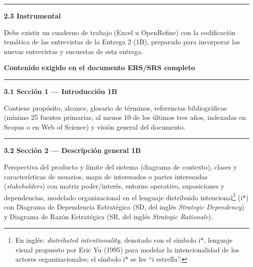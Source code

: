 \documentclass[11pt,a4paper]{article}
\newcounter{secc}
\newcommand{\secband}[1]{%
    \stepcounter{secc}\par\vspace{9pt}\noindent
    {\setlength{\fboxsep}{0pt}%
        \colorbox{uteqgold}{\parbox[c][20pt][c]{0.05\textwidth}{\centering\textbf{\color{white}\small \arabic{secc}}}}%
        \colorbox{uteqgreen}{\parbox[c][20pt][c]{0.95\textwidth}{\hspace{8pt}\textbf{\color{white}\small #1}}}%
    }\par\vspace{5pt}}
\newcommand{\submark}[1]{\par\vspace{4pt}\noindent
    {\color{uteqgreen}\rule[-1pt]{3.5pt}{12pt}}\hspace{6pt}\textbf{\color{uteqgreen}#1}\par\vspace{2pt}}
\newcommand{\bB}{{\setlength{\fboxsep}{1.5pt}\colorbox{uteqgold}{\scriptsize\bfseries\color{white}1B}}}
\begin{document}
\submark{2.3 Instrumental}
Debe existir un cuaderno de trabajo (Excel u OpenRefine) con la codificación temática de las entrevistas de la Entrega 2 (1B), preparado para incorporar las nuevas entrevistas y encuestas de esta entrega.

\secband{Contenido exigido en el documento ERS/SRS completo}

\submark{3.1 Sección 1 --- Introducción \bB}
Contiene propósito, alcance, glosario de términos, referencias bibliográficas (mínimo 25 fuentes primarias, al menos 10 de los últimos tres años, indexadas en Scopus o en Web of Science) y visión general del documento.

\submark{3.2 Sección 2 --- Descripción general \bB}
Perspectiva del producto y límite del sistema (diagrama de contexto), clases y características de usuarios, mapa de interesados o partes interesadas (\emph{stakeholders}) con matriz poder/interés, entorno operativo, suposiciones y dependencias, modelado organizacional en el lenguaje distribuido intencional\footnote{En inglés: \emph{distributed intentionality}, denotado con el símbolo i*, lenguaje visual propuesto por Eric Yu (1995) para modelar la intencionalidad de los actores organizacionales; el símbolo i* se lee ``i estrella''.} (i*) con Diagrama de Dependencia Estratégica (SD, del inglés \emph{Strategic Dependency}) y Diagrama de Razón Estratégica (SR, del inglés \emph{Strategic Rationale}).
\end{document}
